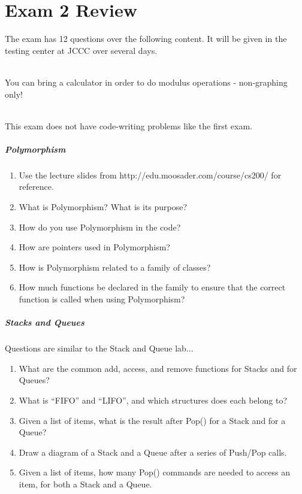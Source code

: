 \documentclass[a4paper,12pt]{book}
\title{}
\author{Rachel Morris}
\date{\today}
\newcounter{question}
\begin{document}
    \chapter*{Exam 2 Review}
    
    The exam has 12 questions over the following content. It will be given
    in the testing center at JCCC over several days.

    ~\\
    You can bring a calculator in order to do modulus operations - non-graphing only!

    ~\\
    This exam does not have code-writing problems like the first exam.

    \paragraph{Polymorphism}

    \begin{enumerate}
        \item   Use the lecture slides from http://edu.moosader.com/course/cs200/ for reference.
        \item   What is Polymorphism? What is its purpose?
        \item   How do you use Polymorphism in the code?
        \item   How are pointers used in Polymorphism?
        \item   How is Polymorphism related to a family of classes?
        \item   How much functions be declared in the family to ensure that
                    the correct function is called when using Polymorphism?
    \end{enumerate}

    \paragraph{Stacks and Queues}

    Questions are similar to the Stack and Queue lab...

    \begin{enumerate}
        \item   What are the common add, access, and remove functions
                    for Stacks and for Queues?
        \item   What is ``FIFO'' and ``LIFO'', and which structures does each belong to?
        \item   Given a list of items, what is the result after Pop() for a Stack and for a Queue?
        \item   Draw a diagram of a Stack and a Queue after a series of Push/Pop calls.
        \item   Given a list of items, how many Pop() commands are needed to access an item, for both a Stack and a Queue.
    \end{enumerate}
\end{document}
